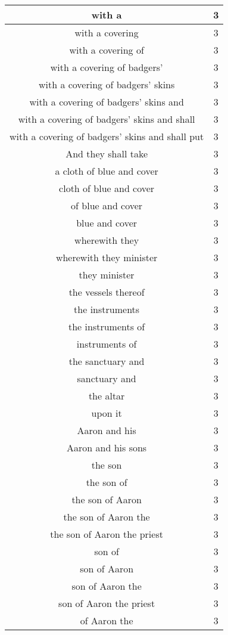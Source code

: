 \begin{center}
\begin{longtable}{|c|c|}
with a & 3\\ \hline 
with a covering & 3\\ \hline 
with a covering of & 3\\ \hline 
with a covering of badgers' & 3\\ \hline 
with a covering of badgers' skins & 3\\ \hline 
with a covering of badgers' skins and & 3\\ \hline 
with a covering of badgers' skins and shall & 3\\ \hline 
with a covering of badgers' skins and shall put & 3\\ \hline 
And they shall take & 3\\ \hline 
a cloth of blue and cover & 3\\ \hline 
cloth of blue and cover & 3\\ \hline 
of blue and cover & 3\\ \hline 
blue and cover & 3\\ \hline 
wherewith they & 3\\ \hline 
wherewith they minister & 3\\ \hline 
they minister & 3\\ \hline 
the vessels thereof & 3\\ \hline 
the instruments & 3\\ \hline 
the instruments of & 3\\ \hline 
instruments of & 3\\ \hline 
the sanctuary and & 3\\ \hline 
sanctuary and & 3\\ \hline 
the altar & 3\\ \hline 
upon it & 3\\ \hline 
Aaron and his & 3\\ \hline 
Aaron and his sons & 3\\ \hline 
the son & 3\\ \hline 
the son of & 3\\ \hline 
the son of Aaron & 3\\ \hline 
the son of Aaron the & 3\\ \hline 
the son of Aaron the priest & 3\\ \hline 
son of & 3\\ \hline 
son of Aaron & 3\\ \hline 
son of Aaron the & 3\\ \hline 
son of Aaron the priest & 3\\ \hline 
of Aaron the & 3\\ \hline 

\end{longtable}
\end{center}
